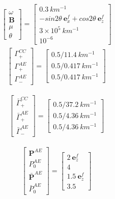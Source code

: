 \documentclass[aps,prd,twocolumn,amsmath,amssymb,groupedaddress]{revtex4-2}
\begin{document}
\begin{eqnarray}
	\begin{bmatrix}
		\omega \\ 
		\textbf{B} \\ 
		\mu \\ 
		\theta
	\end{bmatrix}
	= \begin{bmatrix}
		0.3 ~km^{-1} \\ -sin 2\theta~\textbf{e}_x^f + cos 2\theta~\textbf{e}_z^f \\ 3 \times 10^5 ~km^{-1} \\ 10^{-6}
	\end{bmatrix}
\end{eqnarray}
\begin{eqnarray}
	\begin{bmatrix}
		\Gamma^{CC}_+ \\ \Gamma^{AE}_+ \\ \Gamma^{AE}_-
	\end{bmatrix}
	= \begin{bmatrix}
		0.5/11.4 ~km^{-1} \\ 0.5/0.417 ~km^{-1} \\ 0.5/0.417 ~km^{-1}
	\end{bmatrix}
\end{eqnarray}

\begin{eqnarray}
	\begin{bmatrix}
		\bar{\Gamma}^{CC}_+ \\ \bar{\Gamma}^{AE}_+ \\ \bar{\Gamma}^{AE}_-
	\end{bmatrix}
	= \begin{bmatrix}
		0.5/37.2 ~km^{-1} \\ 0.5/4.36 ~km^{-1} \\ 0.5/4.36 ~km^{-1} 
	\end{bmatrix}
\end{eqnarray}

\begin{eqnarray}
	\begin{bmatrix}
		\textbf{P}^{AE} \\ P^{AE}_0 \\ \bar{\textbf{P}}^{AE} \\ \bar{P}^{AE}_0
	\end{bmatrix}
	= \begin{bmatrix}
		2 ~\textbf{e}_z^f\\ 4 \\ 1.5 ~\textbf{e}_z^f \\ 3.5
	\end{bmatrix}
\end{eqnarray}
\end{document}
